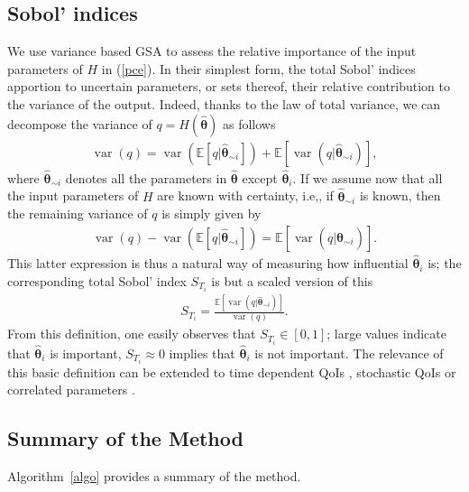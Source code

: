 \subsection{Sobol' indices} 
\label{sec:gsa}
We use variance based GSA to assess the relative importance of the input parameters of $H$ in (\ref{pce}). In their simplest form, the total Sobol' indices \cite{saltellitotalindex} apportion to uncertain parameters, or sets thereof, their relative contribution to the variance of the output. Indeed, thanks to the law of total variance, we can decompose the variance of $q = H(\hat{\boldsymbol{\theta}})$ as follows
\begin{eqnarray}
\operatorname{var}(q) = \operatorname{var}(\mathbb E[q|\hat{\boldsymbol{\theta}}_{\sim i}]) + \mathbb E[\operatorname{var}(q|\hat{\boldsymbol{\theta}}_{\sim i})], \label{ltv}
\end{eqnarray}
where $\hat{\boldsymbol{\theta}}_{\sim i}$ denotes all the parameters in $\hat{\boldsymbol{\theta}}$ except $\hat{\boldsymbol{\theta}}_i$. If we assume now that all the input parameters of $H$ are known with certainty, i.e,, if $\hat{\boldsymbol{\theta}}_{\sim i}$ is known, then the remaining variance of $q$ is simply given by 
\begin{eqnarray*}
\operatorname{var}(q) - \operatorname{var}(\mathbb E[q|\hat{\boldsymbol{\theta}}_{\sim i}]) = \mathbb E[\operatorname{var}(q|\hat{\boldsymbol{\theta}}_{\sim i})]. 
\end{eqnarray*}
This latter expression is thus a natural way of measuring how influential $\hat{\boldsymbol{\theta}}_i$ is; the corresponding total Sobol' index $S_{T_i}$ is but a scaled version of this
\begin{eqnarray}
S_{T_i} = \frac{\mathbb E[\operatorname{var}(q|\hat{\boldsymbol{\theta}}_{\sim i})]}{\operatorname{var}(q) }. \label{sobol}
\end{eqnarray}
From this definition, one easily observes that $S_{T_i} \in [0,1]$; large values indicate that $\hat{\boldsymbol{\theta}}_i$ is important, $S_{T_i} \approx 0$ implies that $\hat{\boldsymbol{\theta}}_i$ is not important.
The relevance of this basic definition can be extended to time dependent QoIs \cite{timegsa}, stochastic QoIs \cite{stogsa} or correlated parameters \cite{corvar}.


\subsection{Summary of the Method}
\label{sec:summary}
Algorithm~\ref{algo} provides a summary of the method. 

